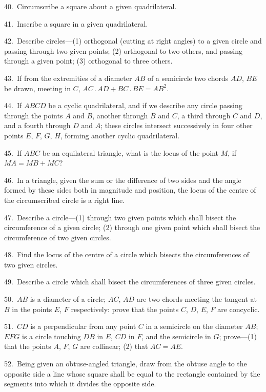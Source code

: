 \documentclass[oneside]{book}
\begin{document}
\begin{footnotesize}
40.~Circumscribe a square about a given quadrilateral.

41.~Inscribe a square in a given quadrilateral.

42.~Describe circles---(1) orthogonal (cutting at right angles) to
a given circle and passing through two given points; (2) orthogonal
to two others, and passing through a given point; (3) orthogonal
to three others.

43.~If from the extremities of a diameter $AB$ of a semicircle
two chords $AD$, $BE$ be drawn, meeting in $C$, $AC\,.\,AD + BC\,.\,BE
= AB^{2}$.

44.~If $ABCD$ be a cyclic quadrilateral, and if we describe any
circle passing through the points $A$ and $B$, another through $B$
and $C$, a third through $C$ and $D$, and a fourth through $D$ and $A$;
these circles intersect\label{circlesin} %
successively in four other points $E$, $F$, $G$, $H$,
forming another cyclic quadrilateral.

45.~If $ABC$ be an equilateral triangle, what is the locus of the
point $M$, if $MA = MB + MC$?

46.~In a triangle, given the sum or the difference of two sides
and the angle formed by these sides both in magnitude and position,
the locus of the centre of the circumscribed circle is a right line.

47.~Describe a circle---(1) through two given points which
shall bisect the circumference of a given circle; (2) through
one given point which shall bisect the circumference of two
given circles.

48.~Find the locus of the centre of a circle which bisects the
circumferences of two given circles.

49.~Describe a circle which shall bisect the circumferences of
three given circles.

50.~$AB$ is a diameter of a circle; $AC$, $AD$ are two chords meeting
the tangent at $B$ in the points $E$, $F$ respectively: prove that
the points $C$, $D$, $E$, $F$ are concyclic.

51.~$CD$ is a perpendicular from any point $C$ in a semicircle on
the diameter $AB$; $EFG$ is a circle touching $DB$ in $E$, $CD$ in $F$,
and the semicircle in $G$; prove---(1) that the points $A$, $F$, $G$ are
collinear; (2) that $AC = AE$.

52.~Being given an obtuse-angled triangle, draw from the
obtuse angle to the opposite side a line whose square shall be
equal to the rectangle contained by the segments into which it
divides the opposite side.


\end{footnotesize}
\end{document}
